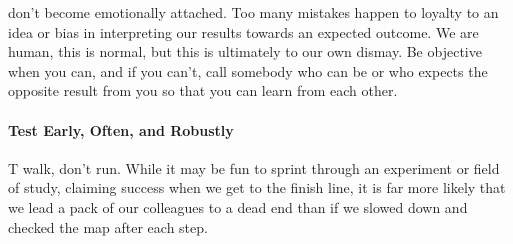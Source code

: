 don't become emotionally attached. Too many mistakes happen to loyalty to an idea or bias in interpreting our results
towards an expected outcome. We are human, this is normal, but this is ultimately to our own dismay. Be objective when
you can, and if you can't, call somebody who can be or who expects the opposite result from you so that you can learn
from each other.

\paragraph*{Test Early, Often, and Robustly}
T
walk, don't run. While it may be fun to sprint through an experiment or field of study, claiming success when we get to
the finish line, it is far more likely that we lead a pack of our colleagues to a dead end than if we slowed down and
checked the map after each step.

